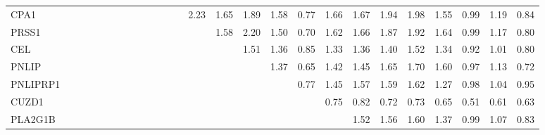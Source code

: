 \begin{longtable}{lrrrrrrrrrrrrrrrrrrrrrrrrr}
CPA1     &              &              &              &              &             &             &             &             &            &            &            &            &        2.23 &      1.65 &        1.89 &           1.58 &        0.77 &          1.66 &      1.67 &        1.94 &        1.98 &       1.55 &       0.99 &        1.19 &        0.84 \\
PRSS1    &              &              &              &              &             &             &             &             &            &            &            &            &             &      1.58 &        2.20 &           1.50 &        0.70 &          1.62 &      1.66 &        1.87 &        1.92 &       1.64 &       0.99 &        1.17 &        0.80 \\
CEL      &              &              &              &              &             &             &             &             &            &            &            &            &             &           &        1.51 &           1.36 &        0.85 &          1.33 &      1.36 &        1.40 &        1.52 &       1.34 &       0.92 &        1.01 &        0.80 \\
PNLIP    &              &              &              &              &             &             &             &             &            &            &            &            &             &           &             &           1.37 &        0.65 &          1.42 &      1.45 &        1.65 &        1.70 &       1.60 &       0.97 &        1.13 &        0.72 \\
PNLIPRP1 &              &              &              &              &             &             &             &             &            &            &            &            &             &           &             &                &        0.77 &          1.45 &      1.57 &        1.59 &        1.62 &       1.27 &       0.98 &        1.04 &        0.95 \\
CUZD1    &              &              &              &              &             &             &             &             &            &            &            &            &             &           &             &                &             &          0.75 &      0.82 &        0.72 &        0.73 &       0.65 &       0.51 &        0.61 &        0.63 \\
PLA2G1B  &              &              &              &              &             &             &             &             &            &            &            &            &             &           &             &                &             &               &      1.52 &        1.56 &        1.60 &       1.37 &       0.99 &        1.07 &        0.83 \\

\end{longtable}
